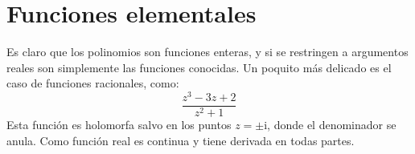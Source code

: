 \section{Funciones elementales}
\label{sec:complex-elementary-functions}

  Es claro que los polinomios son funciones enteras,
  y si se restringen a argumentos reales
  son simplemente las funciones conocidas.
  Un poquito más delicado es el caso de funciones racionales,
  como:
  \begin{equation*}
    \frac{z^3 - 3 z + 2}{z^2 + 1}
  \end{equation*}
  Esta función es holomorfa
  salvo en los puntos \(z = \pm \mathrm{i}\),
  donde el denominador se anula.
  Como función real es continua y tiene derivada en todas partes.

